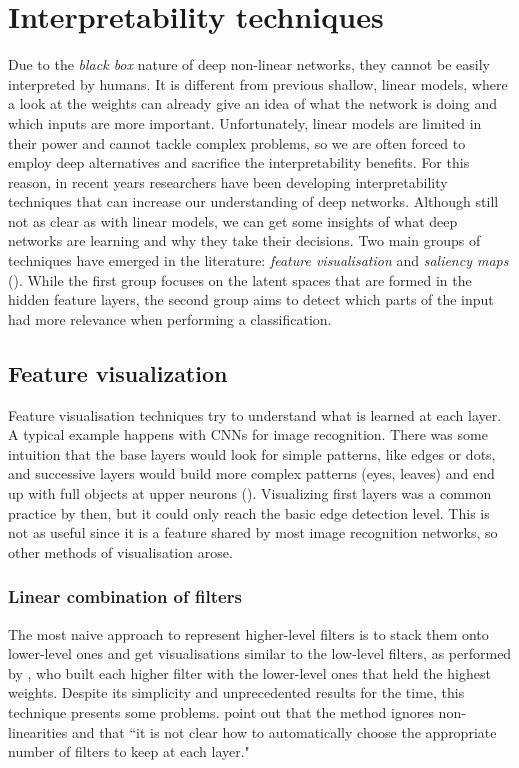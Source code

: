 

\section{Interpretability techniques}

Due to the \textit{black box} nature of deep non-linear networks, they cannot be easily interpreted by humans. It is different from previous shallow, linear models, where a look at the weights can already give an idea of what the network is doing and which inputs are more important. Unfortunately, linear models are limited in their power and cannot tackle complex problems, so we are often forced to employ deep alternatives and sacrifice the interpretability benefits. For this reason, in recent years researchers have been developing interpretability techniques that can increase our understanding of deep networks. Although still not as clear as with linear models, we can get some insights of what deep networks are learning and why they take their decisions. Two main groups of techniques have emerged in the literature: \textit{feature visualisation} and \textit{saliency maps} (\cite{Olah2017}). While the first group focuses on the latent spaces that are formed in the hidden feature layers, the second group aims to detect which parts of the input had more relevance when performing a classification.

\subsection{Feature visualization}\label{sect:featvis}

Feature visualisation techniques try to understand what is learned at each layer. A typical example happens with CNNs for image recognition. There was some intuition that the base layers would look for simple patterns, like edges or dots, and successive layers would build more complex patterns (eyes, leaves) and end up with full objects at upper neurons (\cite{Mordvintsev2015}). Visualizing first layers was a common practice by then, but it could only reach the basic edge detection level. This is not as useful since it is a feature shared by most image recognition networks, so other methods of visualisation arose.

\subsubsection*{Linear combination of filters}
The most naive approach to represent higher-level filters is to stack them onto lower-level ones and get visualisations similar to the low-level filters, as performed by \cite{Lee2009}, who built each higher filter with the lower-level ones that held the highest weights. Despite its simplicity and unprecedented results for the time, this technique presents some problems. \cite{Erhan2009} point out that the method ignores non-linearities and that ``it is not clear how to automatically choose the appropriate number of filters to keep at each layer."

